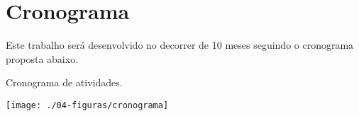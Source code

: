 %
%

\chapter{Cronograma}

Este trabalho será desenvolvido no decorrer de 10 meses seguindo o cronograma proposta abaixo.


\begin{quadro}[H]
	\caption{Cronograma de atividades.}
	\centering
	\texttt{[image: ./04-figuras/cronograma]}
\end{quadro}